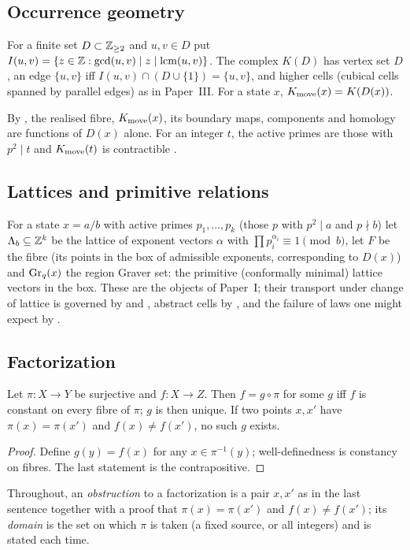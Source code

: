 \subsection{Occurrence geometry}
\begin{definition}
For a finite set $D\subset\mathbb Z_{\ge2}$ and $u,v\in D$ put $I(u,v)=\{z\in\mathbb Z:\gcd(u,v)\mid z\mid\operatorname{lcm}(u,v)\}$. The complex $K(D)$ has vertex set $D$, an edge $\{u,v\}$ iff $I(u,v)\cap(D\cup\{1\})=\{u,v\}$, and higher cells (cubical cells spanned by parallel edges) as in Paper~III. For a state $x$, $K_{\mathrm{move}}(x)=K(D(x))$.
\end{definition}
By , the realised fibre, $K_{\mathrm{move}}(x)$, its boundary maps, components and homology are functions of $D(x)$ alone. For an integer $t$, the active primes are those with $p^2\mid t$ and $K_{\mathrm{move}}(t)$ is contractible \cite[]{PaperIII}.

\subsection{Lattices and primitive relations}
For a state $x=a/b$ with active primes $p_1,\dots,p_k$ (those $p$ with $p^2\mid a$ and $p\nmid b$) let $\Lambda_b\subseteq\mathbb Z^k$ be the lattice of exponent vectors $\alpha$ with $\prod p_i^{\alpha_i}\equiv1\pmod b$, let $F$ be the fibre (its points in the box of admissible exponents, corresponding to $D(x)$) and $\mathrm{Gr}_q(x)$ the region Graver set: the primitive (conformally minimal) lattice vectors in the box. These are the objects of Paper~I; their transport under change of lattice is governed by  and , abstract cells by , and the failure of laws one might expect by .

\subsection{Factorization}
\begin{lemma}\label{lem:factor}
Let $\pi:X\to Y$ be surjective and $f:X\to Z$. Then $f=g\circ\pi$ for some $g$ iff $f$ is constant on every fibre of $\pi$; $g$ is then unique. If two points $x,x'$ have $\pi(x)=\pi(x')$ and $f(x)\ne f(x')$, no such $g$ exists.
\end{lemma}
\begin{proof}Define $g(y)=f(x)$ for any $x\in\pi^{-1}(y)$; well-definedness is constancy on fibres. The last statement is the contrapositive.\end{proof}
Throughout, an \emph{obstruction} to a factorization is a pair $x,x'$ as in the last sentence together with a proof that $\pi(x)=\pi(x')$ and $f(x)\neq f(x')$; its \emph{domain} is the set on which $\pi$ is taken (a fixed source, or all integers) and is stated each time.


